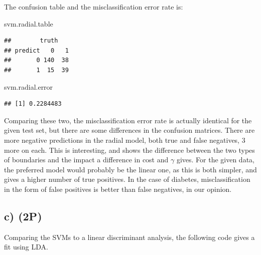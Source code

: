 \documentclass[]{article}
\newenvironment{Shaded}{\begin{snugshade}}{\end{snugshade}}
\newcommand{\DataTypeTok}[1]{\textcolor[rgb]{0.13,0.29,0.53}{#1}}
\newcommand{\DecValTok}[1]{\textcolor[rgb]{0.00,0.00,0.81}{#1}}
\newcommand{\KeywordTok}[1]{\textcolor[rgb]{0.13,0.29,0.53}{\textbf{#1}}}
\newcommand{\NormalTok}[1]{#1}
\newcommand{\OperatorTok}[1]{\textcolor[rgb]{0.81,0.36,0.00}{\textbf{#1}}}
\newcommand{\StringTok}[1]{\textcolor[rgb]{0.31,0.60,0.02}{#1}}
\begin{document}
The confusion table and the misclassification error rate is:

\begin{Shaded}
\begin{Highlighting}[]
\NormalTok{svm.radial.table}
\end{Highlighting}
\end{Shaded}

\begin{verbatim}
##        truth
## predict   0   1
##       0 140  38
##       1  15  39
\end{verbatim}

\begin{Shaded}
\begin{Highlighting}[]
\NormalTok{svm.radial.error}
\end{Highlighting}
\end{Shaded}

\begin{verbatim}
## [1] 0.2284483
\end{verbatim}

Comparing these two, the misclassification error rate is actually
identical for the given test set, but there are some differences in the
confusion matrices. There are more negative predictions in the radial
model, both true and false negatives, 3 more on each. This is
interesting, and shows the difference between the two types of
boundaries and the impact a difference in cost and \(\gamma\) gives. For
the given data, the preferred model would probably be the linear one, as
this is both simpler, and gives a higher number of true positives. In
the case of diabetes, misclassification in the form of false positives
is better than false negatives, in our opinion.

\hypertarget{c-2p-2}{%
\subsection{c) (2P)}\label{c-2p-2}}

Comparing the SVMs to a linear discriminant analysis, the following code
gives a fit using LDA.

\begin{Shaded}
\end{Shaded}
\end{document}
